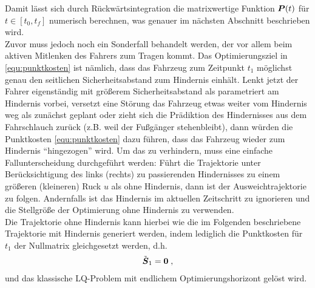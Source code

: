 %
Damit lässt sich durch Rückwärtsintegration die matrixwertige Funktion $\boldsymbol{P}(t)$ für $t\in\left[t_0,t_f\right]$ numerisch berechnen, was genauer im nächsten Abschnitt beschrieben wird. \\
Zuvor muss jedoch noch ein Sonderfall behandelt werden, der vor allem beim aktiven Mitlenken des Fahrers zum Tragen kommt. Das Optimierungsziel in \eqref{equ:punktkosten} ist nämlich, dass das Fahrzeug zum Zeitpunkt $t_1$ möglichst genau den seitlichen Sicherheitsabstand zum Hindernis einhält. Lenkt jetzt der Fahrer eigenständig mit größerem Sicherheitsabstand als parametriert am Hindernis vorbei, versetzt eine Störung das Fahrzeug etwas weiter vom Hindernis weg als zunächst geplant oder zieht sich die Prädiktion des Hindernisses aus dem Fahrschlauch zurück (z.B. weil der Fußgänger stehenbleibt), dann würden die Punktkosten \eqref{equ:punktkosten} dazu führen, dass das Fahrzeug wieder zum Hindernis "`hingezogen"' wird. Um das zu verhindern, muss eine einfache Fallunterscheidung durchgeführt werden: Führt die Trajektorie unter Berücksichtigung des links (rechts) zu passierenden Hindernisses zu einem größeren (kleineren) Ruck $u$ als ohne Hindernis, dann ist der Ausweichtrajektorie zu folgen. Andernfalls ist das Hindernis im aktuellen Zeitschritt zu ignorieren und die Stellgröße der Optimierung ohne Hindernis zu verwenden. \\
Die Trajektorie ohne Hindernis kann hierbei wie die im Folgenden beschriebene Trajektorie mit Hindernis generiert werden, indem lediglich die Punktkosten für $t_1$ der Nullmatrix gleichgesetzt werden, d.h.\
\begin{align*}
	\tilde{ \bs S}_1 = \bs 0 \; ,%
\end{align*}
und das klassische LQ-Problem mit endlichem Optimierungshorizont gelöst wird.



